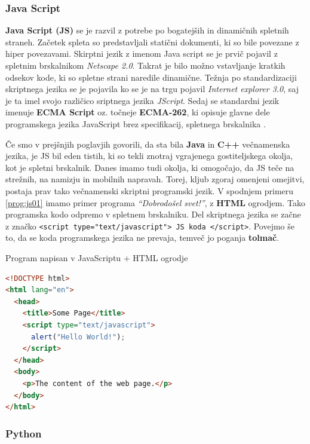 \subsubsection{Java Script}
\label{sec:pj_JS}

\textbf{Java Script (JS)} se je razvil z potrebe po bogatejših in dinamičnih
spletnih straneh. Začetek spleta so predstavljali statični dokumenti,
ki so bile povezane z hiper povezavami. Skirptni jezik z imenom Java
script se je prvič pojavil z spletnim brskalnikom \emph{Netscape
  2.0}. Takrat je bilo možno vstavljanje kratkih odsekov kode, ki so
spletne strani naredile dinamične. Težnja po standardizaciji
skriptnega jezika se je pojavila ko se je na trgu pojavil
\emph{Internet explorer 3.0}, saj je ta imel svojo različico sriptnega
jezika \emph{JScript}. Sedaj se standardni jezik imenuje \textbf{ECMA
  Script} oz. točneje \textbf{ECMA-262}, ki opisuje glavne dele
programskega jezika JavaScript brez specifikacij, spletnega
brskalnika \cite{OO-JS}.

Če smo v prejšnjih poglavjih govorili, da sta bila \textbf{Java} in
\textbf{C++} večnamenska jezika, je JS bil eden tistih, ki so tekli
znotraj vgrajenega gostiteljskega okolja, kot je spletni
brskalnik. Danes imamo tudi okolja, ki omogočajo, da JS teče na
strežnih, na namizju in mobilnih napravah. Torej, kljub zgoraj
omenjeni omejitvi, postaja prav tako večnamenski skriptni programski
jezik. V spodnjem primeru \ref{prog:js01} imamo primer programa
\emph{``Dobrodošel svet!''}, z \textbf{HTML} ogrodjem. Tako programska
kodo odpremo v spletnem brskalniku. Del skriptnega jezika se začne z
značko \texttt{<script type="text/javascript"> JS koda
  </script>}. Povejmo še to, da se koda programskega jezika ne
prevaja, temveč jo poganja \textbf{tolmač}.


\begin{examplebox}[label={prog:js01}]{Program napisan v JavaScriptu +
    HTML ogrodje}
\begin{lstlisting}[language=Html]
<!DOCTYPE html>
<html lang="en">
  <head>
    <title>Some Page</title>
    <script type="text/javascript">
      alert("Hello World!");
    </script>
  </head>
  <body>
    <p>The content of the web page.</p>
  </body>
</html>
\end{lstlisting}
\end{examplebox}

\subsubsection{Python}
\label{sec:pj_python}


